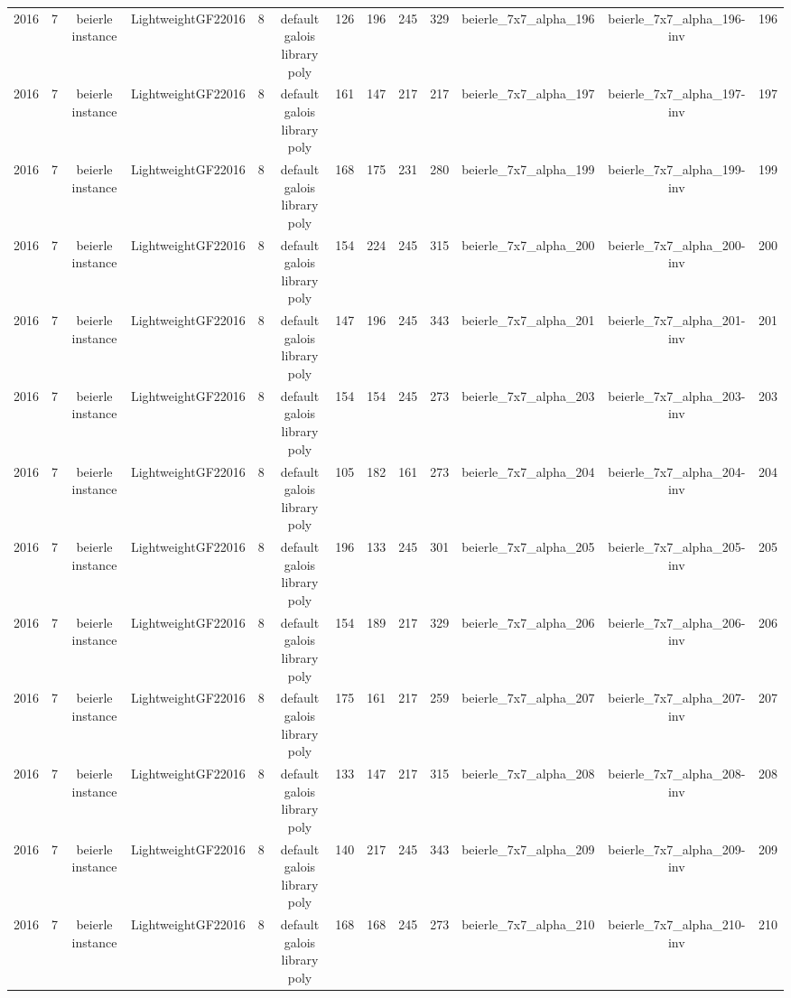 \begin{tabular}{c c c c c c c c c c c c c}
2016 & 7 & beierle instance & LightweightGF22016 & 8 & default galois library poly & 126 & 196 & 245 & 329 & beierle_7x7_alpha_196 & beierle_7x7_alpha_196-inv & 196 \\
2016 & 7 & beierle instance & LightweightGF22016 & 8 & default galois library poly & 161 & 147 & 217 & 217 & beierle_7x7_alpha_197 & beierle_7x7_alpha_197-inv & 197 \\
2016 & 7 & beierle instance & LightweightGF22016 & 8 & default galois library poly & 168 & 175 & 231 & 280 & beierle_7x7_alpha_199 & beierle_7x7_alpha_199-inv & 199 \\
2016 & 7 & beierle instance & LightweightGF22016 & 8 & default galois library poly & 154 & 224 & 245 & 315 & beierle_7x7_alpha_200 & beierle_7x7_alpha_200-inv & 200 \\
2016 & 7 & beierle instance & LightweightGF22016 & 8 & default galois library poly & 147 & 196 & 245 & 343 & beierle_7x7_alpha_201 & beierle_7x7_alpha_201-inv & 201 \\
2016 & 7 & beierle instance & LightweightGF22016 & 8 & default galois library poly & 154 & 154 & 245 & 273 & beierle_7x7_alpha_203 & beierle_7x7_alpha_203-inv & 203 \\
2016 & 7 & beierle instance & LightweightGF22016 & 8 & default galois library poly & 105 & 182 & 161 & 273 & beierle_7x7_alpha_204 & beierle_7x7_alpha_204-inv & 204 \\
2016 & 7 & beierle instance & LightweightGF22016 & 8 & default galois library poly & 196 & 133 & 245 & 301 & beierle_7x7_alpha_205 & beierle_7x7_alpha_205-inv & 205 \\
2016 & 7 & beierle instance & LightweightGF22016 & 8 & default galois library poly & 154 & 189 & 217 & 329 & beierle_7x7_alpha_206 & beierle_7x7_alpha_206-inv & 206 \\
2016 & 7 & beierle instance & LightweightGF22016 & 8 & default galois library poly & 175 & 161 & 217 & 259 & beierle_7x7_alpha_207 & beierle_7x7_alpha_207-inv & 207 \\
2016 & 7 & beierle instance & LightweightGF22016 & 8 & default galois library poly & 133 & 147 & 217 & 315 & beierle_7x7_alpha_208 & beierle_7x7_alpha_208-inv & 208 \\
2016 & 7 & beierle instance & LightweightGF22016 & 8 & default galois library poly & 140 & 217 & 245 & 343 & beierle_7x7_alpha_209 & beierle_7x7_alpha_209-inv & 209 \\
2016 & 7 & beierle instance & LightweightGF22016 & 8 & default galois library poly & 168 & 168 & 245 & 273 & beierle_7x7_alpha_210 & beierle_7x7_alpha_210-inv & 210 \\

\end{tabular}
